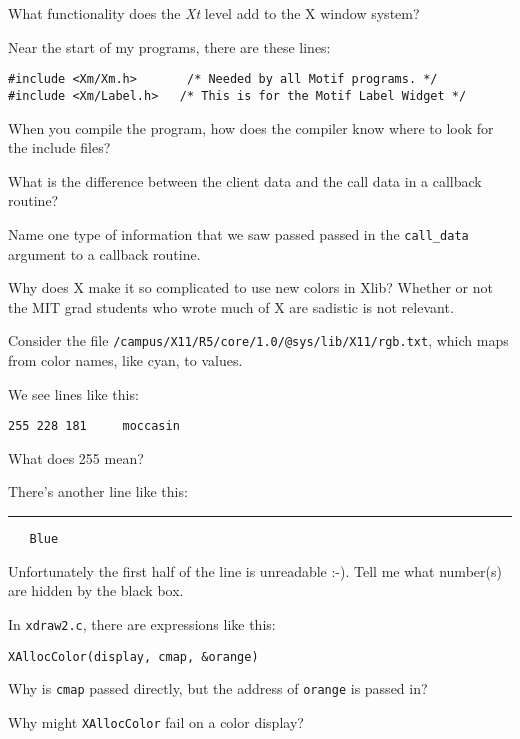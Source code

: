 \documentclass[twoside]{article}
\begin{document}
\begin{enumerate}
 What functionality does the \emph{Xt} level add to the X
window system?

 Near the start of my programs, there are these lines:

\begin{verbatim}
#include <Xm/Xm.h>       /* Needed by all Motif programs. */
#include <Xm/Label.h>   /* This is for the Motif Label Widget */
\end{verbatim}

When you compile the program, how does the compiler know where to
look for the include files?

 What is the difference between the client data and the
call data in a callback routine?

 Name one type of information that we saw passed passed in the
\texttt{call\_data} argument to a callback routine.


 Why does X make it so complicated to use new colors in Xlib?
Whether or not the MIT grad students who wrote much of X are sadistic is
not relevant.


 Consider the file
\texttt{/campus/X11/R5/\-core/1.0/\-@sys/lib/\-X11/rgb.txt}, which maps
from color names, like cyan, to values.
\begin{enumerate}
We see lines like this:

\begin{verbatim}
255 228 181		moccasin
\end{verbatim}

What does 255 mean?

There's another line like this:

\rule{1.2in}{.15in}\verb+   Blue+

Unfortunately the first half of the line is unreadable :-).  Tell
me what number(s) are hidden by the black box.
\end{enumerate}


 In \texttt{xdraw2.c}, there are expressions like this:

\begin{center}
\texttt{XAllocColor(display, cmap, \&orange)}
\end{center}

\noindent Why is \texttt{cmap} passed directly, but the address of
\texttt{orange} is passed in?

 Why might \texttt{XAllocColor} fail on a color display?



\end{enumerate}
\end{document}
